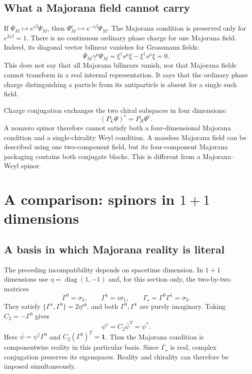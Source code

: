 \documentclass[11pt]{article}
\newcommand{\one}{\mathbf 1}
\newcommand{\diag}{\operatorname{diag}}
\begin{document}
\subsection{What a Majorana field cannot carry}
If \(\Psi_M\mapsto e^{i\beta}\Psi_M\), then
\(\Psi_M^c\mapsto e^{-i\beta}\Psi_M\). The Majorana condition is
preserved only for \(e^{2i\beta}=1\). There is no continuous ordinary
phase charge for one Majorana field. Indeed, its diagonal vector
bilinear vanishes for Grassmann fields:
\begin{equation}
 \bar\Psi_M\gamma^\mu\Psi_M
   =\xi^\dagger s^\mu\xi-\xi^\dagger s^\mu\xi=0.
 \label{eq:Mcurrent}
\end{equation}
This does not say that all Majorana bilinears vanish, nor that Majorana
fields cannot transform in a real internal representation. It says
that the ordinary phase charge distinguishing a particle from its
antiparticle is absent for a single such field.

Charge conjugation exchanges the two chiral subspaces in four
dimensions:
\begin{equation}
 (P_L\Psi)^c=P_R\Psi^c.
 \label{eq:Cchirality}
\end{equation}
A nonzero spinor therefore cannot satisfy both a four-dimensional
Majorana condition and a single-chirality Weyl condition. A massless
Majorana field can be described using one two-component field, but its
four-component Majorana packaging contains both conjugate blocks.
This is different from a Majorana--Weyl spinor.

\section{A comparison: spinors in \texorpdfstring{\(1+1\)}{1+1} dimensions}
\subsection{A basis in which Majorana reality is literal}
The preceding incompatibility depends on spacetime dimension.
In \(1+1\) dimensions use \(\eta=\diag(1,-1)\) and, for this
section only, the two-by-two matrices
\begin{equation}
 \Gamma^0=\sigma_2,\qquad \Gamma^1=i\sigma_1,
 \qquad \Gamma_\star=\Gamma^0\Gamma^1=\sigma_3.
 \label{eq:2dgamma}
\end{equation}
They satisfy \(\{\Gamma^a,\Gamma^b\}=2\eta^{ab}\), and both
\(\Gamma^0,\Gamma^1\) are purely imaginary. Taking
\(C_2=-\Gamma^0\) gives
\begin{equation}
 \psi^c=C_2\bar\psi^T=\psi^*.
 \label{eq:2dc}
\end{equation}
Here \(\bar\psi=\psi^\dagger\Gamma^0\) and
\(C_2(\Gamma^0)^T=\one\). Thus the Majorana condition is componentwise
reality in this particular basis. Since \(\Gamma_\star\) is real,
complex conjugation preserves its eigenspaces. Reality and chirality
can therefore be imposed simultaneously.
\end{document}
